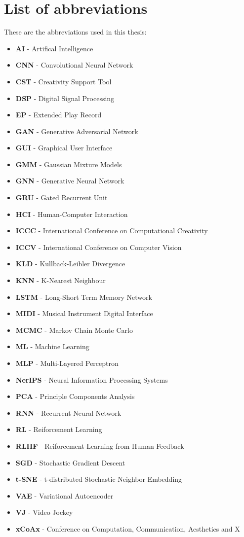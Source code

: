 \chapter*{List of abbreviations}

These are the abbreviations used in this thesis: 
\begin{itemize}
\item \textbf{AI} - Artifical Intelligence
\item \textbf{CNN} - Convolutional Neural Network
\item \textbf{CST} - Creativity Support Tool
\item \textbf{DSP} - Digital Signal Processing
\item \textbf{EP} - Extended Play Record
\item \textbf{GAN} - Generative Adversarial Network
\item \textbf{GUI} - Graphical User Interface
\item \textbf{GMM} - Gaussian Mixture Models
\item \textbf{GNN} - Generative Neural Network
\item \textbf{GRU} - Gated Recurrent Unit
\item \textbf{HCI} - Human-Computer Interaction
\item \textbf{ICCC} - International Conference on Computational Creativity
\item \textbf{ICCV} - International Conference on Computer Vision
\item \textbf{KLD} - Kullback-Leibler Divergence
\item \textbf{KNN} - K-Nearest Neighbour
\item \textbf{LSTM} - Long-Short Term Memory Network
\item \textbf{MIDI} - Musical Instrument Digital Interface
\item \textbf{MCMC} - Markov Chain Monte Carlo
\item \textbf{ML} - Machine Learning
\item \textbf{MLP} - Multi-Layered Perceptron
\item \textbf{NerIPS} - Neural Information Processing Systems
\item \textbf{PCA} - Principle Components Analysis
\item \textbf{RNN} - Recurrent Neural Network
\item \textbf{RL} - Reiforcement Learning
\item \textbf{RLHF} - Reiforcement Learning from Human Feedback
\item \textbf{SGD} - Stochastic Gradient Descent
\item \textbf{t-SNE} - t-distributed Stochastic Neighbor Embedding
\item \textbf{VAE} - Variational Autoencoder
\item \textbf{VJ} - Video Jockey
\item \textbf{xCoAx} - Conference on Computation, Communication, Aesthetics and X
\end{itemize}